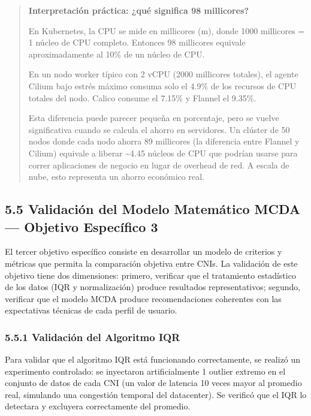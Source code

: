 \documentclass[journal]{IEEEtran}
\begin{document}
\begin{quote}
\textbf{Interpretación práctica: ¿qué significa 98 millicores?}

En Kubernetes, la CPU se mide en millicores (m), donde 1000 millicores = 1 núcleo de CPU completo. Entonces 98 millicores equivale aproximadamente al 10\% de un núcleo de CPU.

En un nodo worker típico con 2 vCPU (2000 millicores totales), el agente Cilium bajo estrés máximo consuma solo el 4.9\% de los recursos de CPU totales del nodo. Calico consume el 7.15\% y Flannel el 9.35\%.

Esta diferencia puede parecer pequeña en porcentaje, pero se vuelve significativa cuando se calcula el ahorro en servidores. Un clúster de 50 nodos donde cada nodo ahorra 89 millicores (la diferencia entre Flannel y Cilium) equivale a liberar \textasciitilde{}4.45 núcleos de CPU que podrían usarse para correr aplicaciones de negocio en lugar de overhead de red. A escala de nube, esto representa un ahorro económico real.
\end{quote}

\subsection{5.5 Validación del Modelo Matemático MCDA --- Objetivo Específico 3}

El tercer objetivo específico consiste en desarrollar un modelo de criterios y métricas que permita la comparación objetiva entre CNIs. La validación de este objetivo tiene dos dimensiones: primero, verificar que el tratamiento estadístico de los datos (IQR y normalización) produce resultados representativos; segundo, verificar que el modelo MCDA produce recomendaciones coherentes con las expectativas técnicas de cada perfil de usuario.

\subsubsection{5.5.1 Validación del Algoritmo IQR}

Para validar que el algoritmo IQR está funcionando correctamente, se realizó un experimento controlado: se inyectaron artificialmente 1 outlier extremo en el conjunto de datos de cada CNI (un valor de latencia 10 veces mayor al promedio real, simulando una congestión temporal del datacenter). Se verificó que el IQR lo detectara y excluyera correctamente del promedio.
\end{document}
